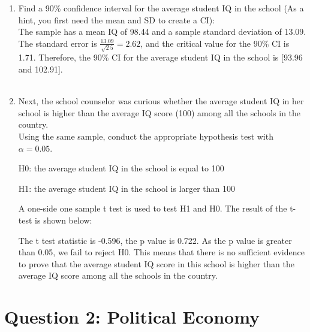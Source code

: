 \documentclass[12pt,letterpaper]{article}
\begin{document}
\begin{enumerate}
	\item Find a 90\% confidence interval for the average student IQ in the school (As a hint, you first need the mean and SD to create a CI):\\
	
	   
	  
	  \noindent The sample has a mean IQ of 98.44 and a sample standard deviation of 13.09. The standard error is $\displaystyle \frac{13.09}{\sqrt25}=2.62$, and the critical value for the 90\% CI is 1.71. Therefore, the 90\% CI for the average student IQ in the school is [93.96 and 102.91]. \\ \\
	  

	
	\item Next, the school counselor was curious  whether  the average student IQ in her school is higher than the average IQ score (100) among all the schools in the country.\\ 
	\noindent Using the same sample, conduct the appropriate hypothesis test with $\alpha=0.05$.
	

	
	
	   
	   
	   \noindent  H0: the average student IQ in the school is equal to 100 
	   
	   H1: the average student IQ in the school is larger than 100 
	   
	   A one-side one sample t test is used to test H1 and H0. The result of the t-test is shown below:
	   
	   
	   
	   \noindent The t test statistic is -0.596, the p value is 0.722. As the p value is greater than 0.05, we fail to reject H0. This means that there is no sufficient evidence to prove that the average student IQ score in this school is higher than the average IQ score among all the schools in the country.
	   
	  
	
\end{enumerate}

\newpage

	\section*{Question 2: Political Economy}
\end{document}
